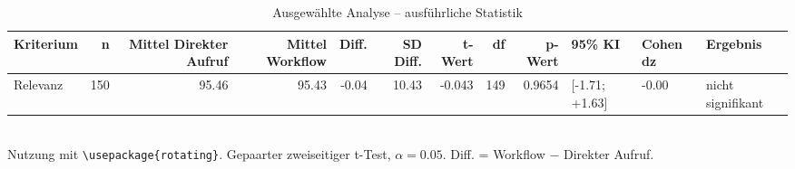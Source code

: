 \begin{table}
\centering
\caption{Ausgewählte Analyse -- ausführliche Statistik}
\begin{tabular}{lrrrrrrrrlll}
\toprule
Kriterium & n & Mittel Direkter Aufruf & Mittel Workflow & Diff. & SD Diff. & t-Wert & df & p-Wert & 95\% KI & Cohen dz & Ergebnis \\
\midrule
Relevanz & 150 & 95.46 & 95.43 & -0.04 & 10.43 & -0.043 & 149 & 0.9654 & [-1.71; +1.63] & -0.00 & nicht signifikant \\
\bottomrule
\end{tabular}
\\[2mm]
\footnotesize Nutzung mit \texttt{\textbackslash usepackage\{rotating\}}. Gepaarter zweiseitiger t-Test, $\alpha=0.05$. Diff. = Workflow $-$ Direkter Aufruf.
\end{table}

